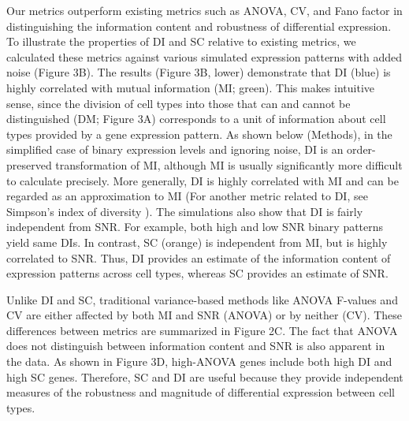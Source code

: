 Our metrics outperform existing metrics such as ANOVA, CV, and Fano factor in distinguishing the information content and robustness of differential expression. To illustrate the properties of DI and SC relative to existing metrics, we calculated these metrics against various simulated expression patterns with added noise (Figure 3B). The results (Figure 3B, lower) demonstrate that DI (blue) is highly correlated with mutual information (MI; green). This makes intuitive sense, since the division of cell types into those that can and cannot be distinguished (DM; Figure 3A) corresponds to a unit of information about cell types provided by a gene expression pattern. As shown below (Methods), in the simplified case of binary expression levels and ignoring noise, DI is an order-preserved transformation of MI, although MI is usually significantly more difficult to calculate precisely. More generally, DI is highly correlated with MI and can be regarded as an approximation to MI (For another metric related to DI, see Simpson's index of diversity \cite{SIMPSON_1949}). The simulations also show that DI is fairly independent from SNR. For example, both high and low SNR binary patterns yield same DIs. In contrast, SC (orange) is independent from MI, but is highly correlated to SNR. Thus, DI provides an estimate of the information content of expression patterns across cell types, whereas SC provides an estimate of SNR.

Unlike DI and SC, traditional variance-based methods like ANOVA F-values and CV are either affected by both MI and SNR (ANOVA) or by neither (CV). These  differences between metrics are summarized in Figure 2C. The fact that ANOVA does not distinguish between information content and SNR is also apparent in the data. As shown in Figure 3D, high-ANOVA genes include both high DI and high SC genes. Therefore, SC and DI are useful because they provide independent measures of the robustness and magnitude of differential expression between cell types.






















